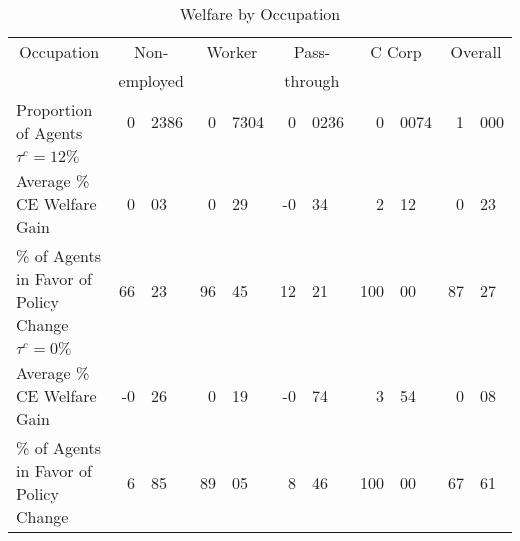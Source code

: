 \documentclass[12pt]{article}
\begin{document}
\begin{table}[!ht]
\caption{\sc Welfare by Occupation}
\label{tab_CE}
\begin{center}
\begin{tabular}{lr@{.}lr@{.}lr@{.}lr@{.}lr@{.}l}
\hline\hline
\multicolumn{ 1}{c}{Occupation} & \multicolumn{ 2}{c}{Non-} & \multicolumn{ 2}{c}{Worker} & \multicolumn{ 2}{c}{Pass-} & \multicolumn{ 2}{c}{C Corp} & \multicolumn{ 2}{c}{Overall} \\

\multicolumn{ 1}{c}{} & \multicolumn{ 2}{c}{employed} &   \multicolumn{ 2}{c}{} & \multicolumn{ 2}{c}{through} &   \multicolumn{ 2}{c}{} &   \multicolumn{ 2}{c}{} \\
\hline
Proportion of Agents &          0 &       2386 &          0 &       7304 &          0 &       0236 &          0 &       0074 &          1 &        000 \\
\hline
                                                                            \multicolumn{ 11}{l}{\bf $\tau^c=12\%$} \\

Average \% CE Welfare Gain &          0 &         03 &          0 &         29 &         -0 &         34 &          2 &         12 &          0 &         23 \\

\% of Agents in Favor of Policy Change &         66 &         23 &         96 &         45 &         12 &         21 &        100 &         00 &         87 &         27 \\
\hline
                                                                                    \multicolumn{ 11}{l}{\bf $\tau^c=0\%$} \\

Average \% CE Welfare Gain &         -0 &         26 &          0 &         19 &         -0 &         74 &          3 &         54 &          0 &         08 \\

\% of Agents in Favor of Policy Change &          6 &         85 &         89 &         05 &          8 &         46 &        100 &         00 &         67 &         61 \\
\hline\hline
\end{tabular}       
\end{center}
\end{table}
\end{document}
